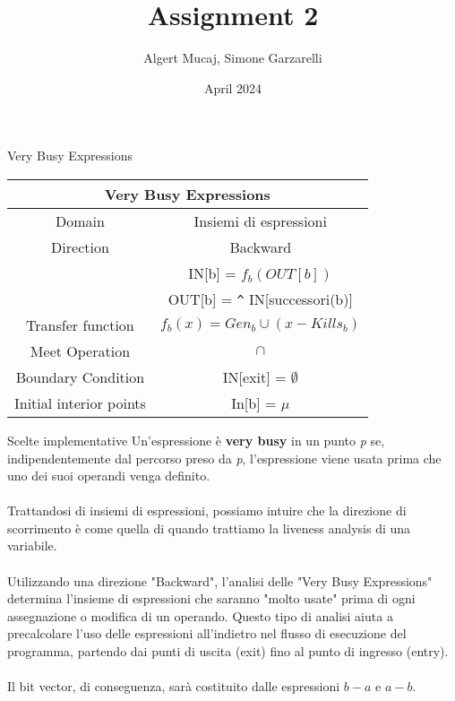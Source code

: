 \documentclass{article}
\title{Assignment 2}
\author{Algert Mucaj, Simone Garzarelli}
\date{April 2024}
\begin{document}
	\maketitle
\begin{section}{Very Busy Expressions}
	

\large %
\renewcommand{\arraystretch}{1.5} %

	
\begin{longtable}{| c | c |}
	\hline
	\multicolumn{2}{|c|}{\textbf{Very Busy Expressions}} \\
	\hline
	Domain & Insiemi di espressioni \\
	\hline
	Direction & Backward \\
	  & IN[b] = $f_b (OUT[b])$ \\
	  & OUT[b] = \verb*|^| IN[successori(b)] \\
	\hline
	Transfer function &  $f_b(x) = Gen_b \cup (x - Kills_b)$\\
	\hline
	Meet Operation & $\cap$ \\
	\hline
	Boundary Condition & IN[exit] = $\emptyset$ \\
	\hline
	Initial interior points & In[b] = $\mu$ \\
	\hline
\end{longtable}

\begin{subsection}{Scelte implementative}
	Un’espressione è \textbf{very busy} in un
	punto \textit{p} se, indipendentemente
	dal percorso preso da \textit{p},
	l’espressione viene usata prima
	che uno dei suoi operandi venga
	definito. \\ \\
	Trattandosi di insiemi di espressioni, possiamo intuire che la direzione di scorrimento è come quella di quando trattiamo la liveness analysis di una variabile.
	\\\\
	Utilizzando una direzione "Backward", l'analisi delle "Very Busy Expressions" determina l'insieme di espressioni che saranno "molto usate" prima di ogni assegnazione o modifica di un operando. Questo tipo di analisi aiuta a precalcolare l'uso delle espressioni all'indietro nel flusso di esecuzione del programma, partendo dai punti di uscita (exit) fino al punto di ingresso (entry).
	\\ \\
	Il bit vector, di conseguenza, sarà costituito dalle espressioni $b-a$ e $a-b$.\\
	

\end{subsection}
\end{section}
\end{document}

